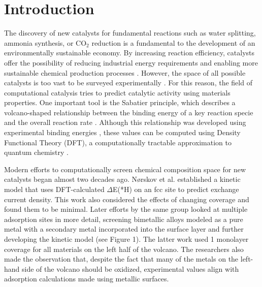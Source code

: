 \documentclass[preprint,12pt]{elsarticle}
\begin{document}

\raggedright
\section{Introduction}

The discovery of new catalysts for fundamental reactions such as water splitting, ammonia synthesis, or CO$_2$ reduction is a fundamental to the development of an environmentally sustainable economy. By increasing reaction efficiency, catalysts offer the possibility of reducing industrial energy requirements and enabling more sustainable chemical production processes \cite{osti_1545774}. However, the space of all possible catalysts is too vast to be surveyed experimentally \cite{tran2018active}. For this reason, the field of computational catalysis tries to predict catalytic activity using materials properties. One important tool is the Sabatier principle, which describes a volcano-shaped relationship between the binding energy of a key reaction specie and the overall reaction rate \cite{medford2015Sabatier}. Although this relationship was developed using experimental binding energies \cite{trasatti1972work}, these values can be computed using Density Functional Theory (DFT), a computationally tractable approximation to quantum chemistry \cite{osti_1545774,ooka2021sabatier}.

Modern efforts to computationally screen chemical composition space for new catalysts began almost two decades ago. N{\o}rskov et al. \cite{norskov2005trends} established a kinetic model that uses DFT-calculated $\Delta$E(*H) on an fcc site to predict exchange current density. This work also considered the effects of changing coverage and found them to be minimal. Later efforts by the same group looked at multiple adsorption sites in more detail, screening bimetallic alloys modeled as a pure metal with a secondary metal incorporated into the surface layer \cite{greeley2006computational} and further developing the kinetic model \cite{skulason2010modeling} (see Figure 1). The latter work used 1 monolayer coverage for all materials on the left half of the volcano. The researchers also made the observation that, despite the fact that many of the metals on the left-hand side of the volcano should be oxidized, experimental values align with adsorption calculations made using metallic surfaces. 
\end{document}
